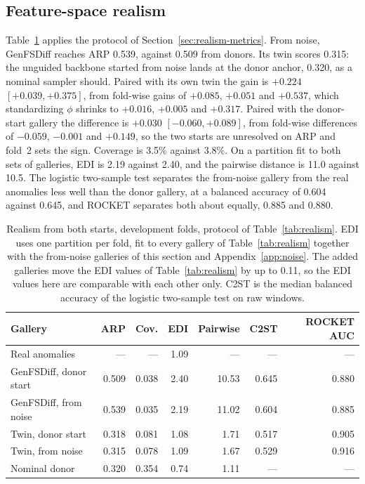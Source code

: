 \documentclass[11pt,a4paper]{article}
\newcommand{\phivec}{\phi}                 %
\begin{document}
\subsection{Feature-space realism}
\label{sec:noise-realism}

Table~\ref{tab:noise} applies the protocol of Section~\ref{sec:realism-metrics}.
From noise, GenFSDiff reaches ARP 0.539, against 0.509 from donors. Its twin
scores 0.315: the unguided backbone started from noise lands at the donor
anchor, 0.320, as a nominal sampler should. Paired with its own twin the gain
is $+0.224$ $[+0.039, +0.375]$, from fold-wise gains of $+0.085$, $+0.051$ and
$+0.537$, which standardizing $\phivec$ shrinks to $+0.016$, $+0.005$ and
$+0.317$. Paired with the donor-start gallery the difference is $+0.030$
$[-0.060, +0.089]$, from fold-wise differences of $-0.059$, $-0.001$ and
$+0.149$, so the two starts are unresolved on ARP and fold~2 sets the sign.
Coverage is 3.5\% against 3.8\%. On a partition fit to both sets of
galleries, EDI is 2.19 against 2.40, and the pairwise distance is 11.0 against
10.5. The logistic two-sample test separates the from-noise gallery from the
real anomalies less well than the donor gallery, at a balanced accuracy of
0.604 against 0.645, and ROCKET separates both about equally, 0.885 and
0.880.

\begin{table}[t]
\centering
\caption{Realism from both starts, development folds, protocol of
Table~\ref{tab:realism}. EDI uses one partition per fold, fit to every gallery
of Table~\ref{tab:realism} together with the from-noise galleries of this
section and Appendix~\ref{app:noise}. The added galleries move the EDI values
of Table~\ref{tab:realism} by up to 0.11, so the EDI values here are
comparable with each other only. C2ST is the median balanced accuracy of the
logistic two-sample test on raw windows.}
\label{tab:noise}
\small
\begin{tabular}{@{}lrrrrrr@{}}
\toprule
Gallery & ARP & Cov. & EDI & Pairwise & C2ST & ROCKET AUC \\
\midrule
Real anomalies & --- & --- & 1.09 & --- & --- & --- \\
\addlinespace
GenFSDiff, donor start & 0.509 & 0.038 & 2.40 & 10.53 & 0.645 & 0.880 \\
GenFSDiff, from noise & 0.539 & 0.035 & 2.19 & 11.02 & 0.604 & 0.885 \\
Twin, donor start & 0.318 & 0.081 & 1.08 & 1.71 & 0.517 & 0.905 \\
Twin, from noise & 0.315 & 0.078 & 1.09 & 1.67 & 0.529 & 0.916 \\
\addlinespace
Nominal donor & 0.320 & 0.354 & 0.74 & 1.11 & --- & --- \\
\bottomrule
\end{tabular}
\end{table}
\end{document}
